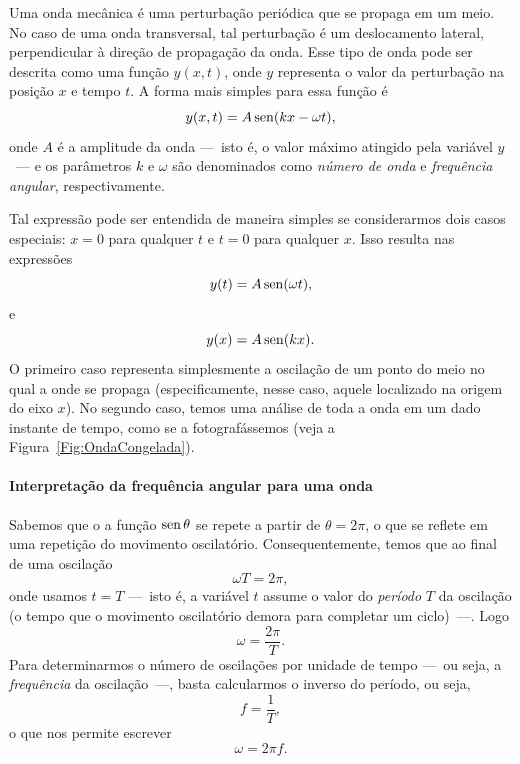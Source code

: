 Uma onda mecânica é uma perturbação periódica que se propaga em um meio. No caso de uma onda transversal, tal perturbação é um deslocamento lateral, perpendicular à direção de propagação da onda. Esse tipo de onda pode ser descrita como uma função $y(x,t)$, onde $y$ representa o valor da perturbação na posição $x$ e tempo $t$. A forma mais simples para essa função é
\begin{equation}\label{Eq:OndaUnidimensional}
	y(x,t) = A \operatorname{sen}(kx - \omega t),
\end{equation}
%
onde $A$ é a amplitude da onda ---~isto é, o valor máximo atingido pela variável $y$~--- e os parâmetros $k$ e $\omega$ são denominados como \emph{número de onda} e \emph{frequência angular}, respectivamente.

Tal expressão pode ser entendida de maneira simples se considerarmos dois casos especiais: $x = 0$ para qualquer $t$ e $t = 0$ para qualquer $x$. Isso resulta nas expressões
\begin{equation}
	y(t) = A \operatorname{sen} (\omega t),
\end{equation}
%
e
\begin{equation}
	y(x) = A \operatorname{sen}(kx).
\end{equation}
%
O primeiro caso representa simplesmente a oscilação de um ponto do meio no qual a onde se propaga (especificamente, nesse caso, aquele localizado na origem do eixo $x$). No segundo caso, temos uma análise de toda a onda em um dado instante de tempo, como se a fotografássemos (veja a Figura~\ref{Fig:OndaCongelada}).

\paragraph{Interpretação da frequência angular para uma onda}

Sabemos que o a função $\operatorname{sen} \theta$ se repete a partir de $\theta = 2\pi$, o que se reflete em uma repetição do movimento oscilatório. Consequentemente, temos que ao final de uma oscilação
\begin{equation}
	\omega T = 2 \pi,
\end{equation}
%
onde usamos $t = T$ ---~isto é, a variável $t$ assume o valor do \emph{período} $T$ da oscilação (o tempo que o movimento oscilatório demora para completar um ciclo)~---. Logo
\begin{equation}
	\omega = \frac{2 \pi}{T}.
\end{equation}
%
Para determinarmos o número de oscilações por unidade de tempo ---~ou seja, a \emph{frequência} da oscilação~---, basta calcularmos o inverso do período, ou seja,
\begin{equation}
	f = \frac{1}{T},
\end{equation}
%
o que nos permite escrever
\begin{equation}
	\omega = 2 \pi f.
\end{equation}

